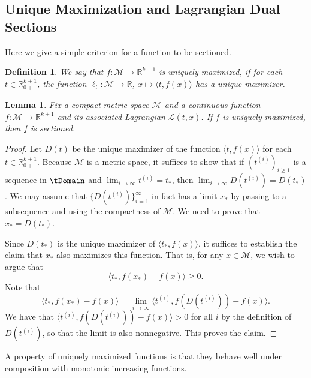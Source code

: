 \documentclass{article}
\numberwithin{equation}{section}
\newcommand{\R}{\mathbb{R}}
\newtheorem{lemma}{Lemma}[section]
\newtheorem{definition}{Definition}[section]
\newcommand{\cL}{\mathcal{L}}
\newcommand{\Rplus}{\R_{0+}}
\newcommand{\cM}{{\mathcal{M}}}
\begin{document}
\subsection{Unique Maximization and Lagrangian Dual Sections}
\label{sec:unique_maximization}
Here we give a simple criterion for a function to be sectioned.
\begin{definition}
We say that  
$f : \cM \rightarrow \R^{k+1}$ is \emph{uniquely maximized}, if for each $t \in  \Rplus^{k+1}$, 
the function $\ell_t:\cM\to\mathbb{R}$, 
$x\mapsto \langle t, f(x)\rangle$
has a unique maximizer.
\end{definition}

\medskip
\begin{lemma}
\label{lem:unique_max}
    Fix a compact metric space $\cM$ and a continuous function $f : \cM \rightarrow \R^{k+1}$ and its associated Lagrangian $\cL(t,x)$. If $f$ is uniquely maximized, then $f$ is sectioned.
\end{lemma}

\begin{proof}
\label{prf:unique_max}
Let $D(t)$ be the unique maximizer of the function $\langle t, f(x)\rangle$ for each $t \in \Rplus^{k+1}$.
Because $\cM$ is a metric space, it suffices to show that if $\left(t^{(i)}\right)_{i\ge 1} $ is a sequence in $\tDomain $ and $\lim_{i \rightarrow \infty} t^{(i)} = t_*$, then $\lim_{i \rightarrow \infty} D(t^{(i)}) = D(t_*)$.
We may assume that $\{D(t^{(i)})\}_{i=1}^{\infty}$ in fact has a limit $x_*$ by passing to a subsequence and using the compactness of $\cM$. We need to prove that $x_* = D(t_*)$.

Since $D(t_*)$ is the unique maximizer of $\langle t_*, f(x)\rangle$, it suffices to establish the claim that $x_*$ also maximizes this function.
That is, for any $x \in \cM$, we wish to argue that 
\[
    \langle t_*, f(x_*) - f(x) \rangle \ge 0.
\]
Note that 
\[
    \langle t_*, f(x_*)-f(x) \rangle = \lim_{i\rightarrow \infty} \langle t^{(i)}, f(D(t^{(i)})) - f(x) \rangle.
\]
We have that $\langle t^{(i)}, f(D(t^{(i)})) - f(x) \rangle > 0$ for all $i$ by the definition of $D(t^{(i)})$, so that the limit is also nonnegative. This proves the claim. 
\end{proof}

A property of uniquely maximized functions is that they behave well under composition with monotonic increasing functions.
\end{document}
